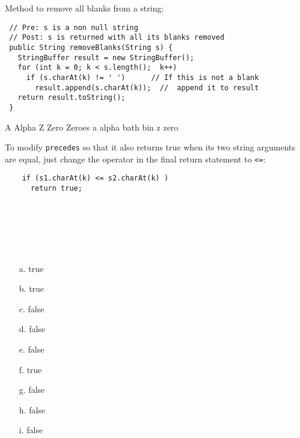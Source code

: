 \begin{ANS}

\item  Method to remove all blanks from a string:
\verb| |

\begin{jjjlisting}
\begin{lstlisting}
 // Pre: s is a non null string
 // Post: s is returned with all its blanks removed
 public String removeBlanks(String s) {
   StringBuffer result = new StringBuffer();
   for (int k = 0; k < s.length();  k++)
     if (s.charAt(k) != ' ')      // If this is not a blank
       result.append(s.charAt(k));  //  append it to result
   return result.toString();
 }
\end{lstlisting}
\end{jjjlisting}


\item  A Alpha Z Zero Zeroes a alpha bath bin z zero



\item  To modify {\tt precedes} so that it also
returns true when its two string arguments are equal, just
change the operator in the final return statement to \verb|<=|:

\begin{jjjlisting}
\begin{lstlisting}
    if (s1.charAt(k) <= s2.charAt(k) )
      return true;
\end{lstlisting}
\end{jjjlisting}


\begin{multicols}{4}
\item\mbox{ }

\mbox{ }

\mbox{ }

\begin{enumerate}
\item[a.]  true  
\item[b.]  true  
\item[c.]  false 
\item[d.]  false 
\item[e.]  false 
\item[f.]  true  
\item[g.]  false 
\item[h.]  false 
\item[i.]  false 
\end{enumerate}
\end{multicols}


\end{ANS}
